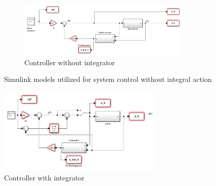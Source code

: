 \begin{figure}[H]
    \begin{subfigure}{0.95\textwidth}
        \includegraphics[width=0.9\textwidth]{Figs/Simulink Models/Controller_without_integrator.png}
        \caption{Controller without integrator}
        \label{fig:controller_without_integrator}
    \end{subfigure}
    \caption{Simulink models utilized for system control without integral action}
    \label{fig:simulink_models_no_integrator}
\end{figure}



\begin{figure}[H]
    \centering
    \includegraphics[width=0.7\textwidth]{Figs/Simulink Models/controller_with_integrator.png}
    \caption{Controller with integrator}
    \label{fig:controler_with_integrator}
\end{figure}
